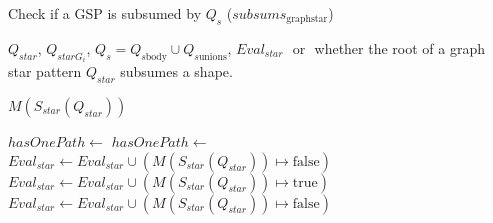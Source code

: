 \begin{algorithm}[h]
    \caption{Check if a GSP is subsumed by $Q_s$ ($subsums_{\mathrm{graph star}}$)}\label{alg:containmentTree}
    \begin{algorithmic}[1]
       \scriptsize
 
       \REQUIRE  $Q_{star}$, $Q_{starG_i}$, $Q_s = Q_{s\mathrm{body}} \cup Q_{s\mathrm{unions}}$, $Eval_{star}$
       \ENSURE \TRUE $ $ or \FALSE $ $ whether the root of a graph star pattern $Q_{star}$ subsumes a shape.
 
          \RETURN $M(S_{star}(Q_{star}))$
       \ENDIF 
 
             \STATE $hasOnePath \gets $ \FALSE
                   \STATE $hasOnePath \gets $ \TRUE
                \ENDIF
             \ENDFOR
             \STATE $Eval_{star} \gets Eval_{star} \cup (M(S_{star}(Q_{star})) \mapsto \mathrm{false})$
                \RETURN \FALSE
             \ENDIF
          \ELSE
               \STATE $Eval_{star} \gets Eval_{star} \cup (M(S_{star}(Q_{star})) \mapsto \mathrm{true})$
                  \STATE $Eval_{star} \gets Eval_{star} \cup (M(S_{star}(Q_{star})) \mapsto \mathrm{false})$
                   \RETURN \FALSE
                \ENDIF
             \ENDIF
          \ENDIF
       \ENDFOR
 
       \RETURN \TRUE
    \end{algorithmic}
 \end{algorithm}